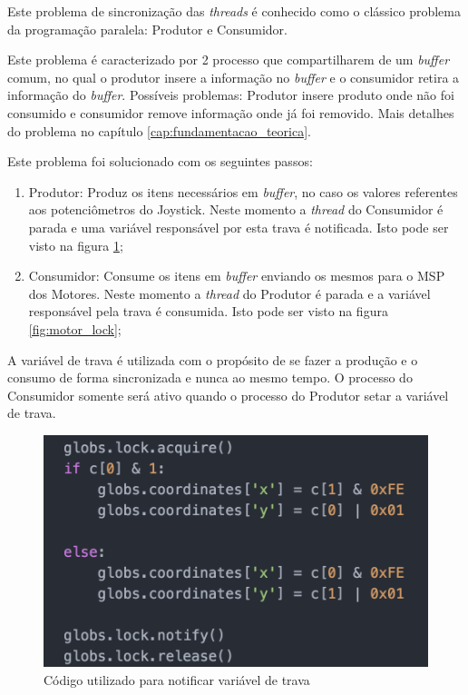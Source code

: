 		Este problema de sincronização das \textit{threads} é conhecido como o clássico problema da programação paralela: Produtor e Consumidor.

		Este problema é caracterizado por 2 processo que compartilharem de um \textit{buffer} comum, no qual o produtor insere a informação no \textit{buffer} e o consumidor retira a informação do \textit{buffer}. Possíveis problemas: Produtor insere produto onde não foi consumido e consumidor remove informação onde já foi removido. Mais detalhes do problema no capítulo \ref{cap:fundamentacao_teorica}.

		Este problema foi solucionado com os seguintes passos:
		\begin{enumerate}
			\item Produtor: Produz os itens necessários em \textit{buffer}, no caso os valores referentes aos potenciômetros do Joystick. Neste momento a \textit{thread} do Consumidor é parada e uma variável responsável por esta trava é notificada. Isto pode ser visto na figura \ref{fig:joy_lock};
			\item Consumidor: Consume os itens em \textit{buffer} enviando os mesmos para o MSP dos Motores. Neste momento a \textit{thread} do Produtor é parada e a variável responsável pela trava é consumida. Isto pode ser visto na figura \ref{fig:motor_lock};
		\end{enumerate}

		A variável de trava é utilizada com o propósito de se fazer a produção e o consumo de forma sincronizada e nunca ao mesmo tempo. O processo do Consumidor somente será ativo quando o processo do Produtor setar a variável de trava.

		\begin{figure}[!htb]
			\centering
			\includegraphics[keepaspectratio=true,scale=0.5]{figuras/resultados/joy_lock}
			\caption{Código utilizado para notificar variável de trava}
			\label{fig:joy_lock}
		\end{figure}

